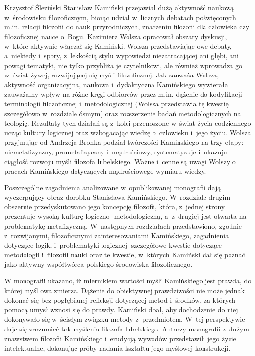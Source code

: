 \begin{recplenv}{Krzysztof Śleziński}
Stanisław Kamiński przejawiał dużą aktywność naukową w~środowisku filozoficznym, biorąc udział w~licznych debatach
poświęconych m.in. relacji filozofii do nauk przyrodniczych, znaczeniu filozofii dla człowieka czy filozoficznej nauce
o~Bogu. Kazimierz Wolsza opracował obszary dyskusji, w~które aktywnie włączał się Kamiński. Wolsza przedstawiając owe
debaty, a~niekiedy i~spory, z~lekkością stylu wypowiedzi niezatracającej ani głębi, ani powagi tematyki, nie tylko
przybliża je czytelnikowi, ale również wprowadza go w~świat żywej, rozwijającej się myśli filozoficznej. Jak zauważa
Wolsza, aktywność organizacyjna, naukowa i~dydaktyczna Kamińskiego wywierała zauważalny wpływ na różne kręgi odbiorców
przez m.in. dążenie do kodyfikacji terminologii filozoficznej i~metodologicznej (Wolsza przedstawia tę kwestię
szczegółowo w~rozdziale ósmym) oraz rozszerzenie badań metodologicznych na teologię. Rezultaty tych działań są z~kolei
przenoszone w~świat życia codziennego ucząc kultury logicznej oraz wzbogacając wiedzę o~człowieku i~jego życiu. Wolsza
przyjmując od Andrzeja Bronka podział twórczości Kamińskiego na trzy etapy: niemetafizyczny,
prometafizyczny i~mądrościowy, systematyzuje i~ukazuje ciągłość rozwoju myśli filozofa lubelskiego.
Ważne i~cenne są uwagi Wolszy o
pracach Kamińskiego dotyczących mądrościowego wymiaru wiedzy. 

Poszczególne zagadnienia analizowane w~opublikowanej monografii dają wyczerpujący obraz dorobku Stanisława Kamińskiego.
W~rozdziale drugim obszernie przedyskutowano jego koncepcję filozofii, która, z~jednej strony prezentuje wysoką kulturę
logiczno-\mbox{-metodologiczną}, %
a~z~drugiej jest otwarta na problematykę metafizyczną. W~następnych rozdziałach przedstawiono,
zgodnie z~rozwijanymi, filozoficznymi zainteresowaniami Kamińskiego, zagadnienia dotyczące logiki i~problematyki
logicznej, szczegółowe kwestie dotyczące metodologii i~filozofii nauki oraz te kwestie, w~których Kamiński dał się
poznać jako aktywny współtwórca polskiego środowiska filozoficznego.

W monografii ukazano, iż miernikiem wartości myśli Kamińskiego jest prawda, do której myśl owa zmierza. Dążenie do
obiektywnej prawdziwości nie może jednak dokonać się bez pogłębianej refleksji dotyczącej metod i~środków, za których
pomocą umysł wznosi się do prawdy. Kamiński dbał, aby dochodzenie do niej dokonywało się w~ścisłym związku
metody z~przedmiotem. W~tej perspektywie daje się zrozumieć tok myślenia filozofa lubelskiego. Autorzy monografii z~dużym
znawstwem filozofii Kamińskiego i~erudycją wywodów przedstawili jego życie intelektualne, dokonując próby nadania
kształtu jego myślowej konstrukcji.


\end{recplenv}
